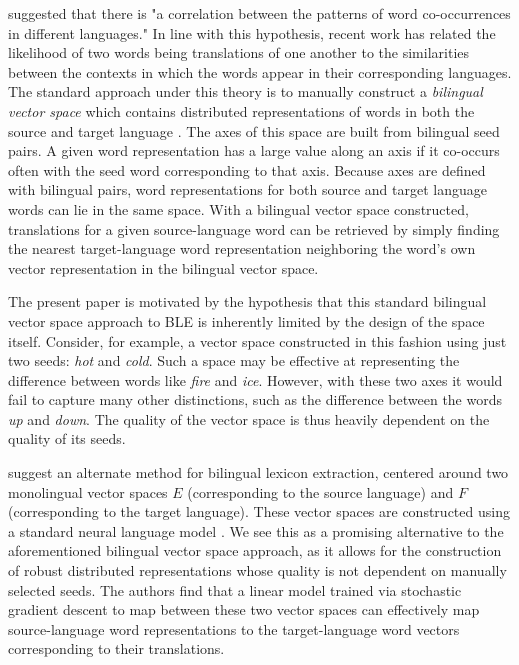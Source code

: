 \documentclass[11pt]{article}
\begin{document}
 suggested that there is "a correlation between the patterns
of word co-occurrences in different languages." In line with this hypothesis,
recent work has related the likelihood of two words being translations of one
another to the similarities between the contexts in which the words appear in
their corresponding languages. The standard approach under this theory is to
manually construct a \textit{bilingual vector space} which contains distributed
representations of words in both the source and target language
\cite{fung1998,vulic2013}. The axes of this space are built from
bilingual seed pairs. A given word representation has a large value along an axis
if it co-occurs often with the seed word corresponding to that axis. Because
axes are defined with bilingual pairs, word representations for both source and
target language words can lie in the same space. With a bilingual vector space
constructed, translations for a given source-language word can be retrieved by
simply finding the nearest target-language word representation neighboring the
word's own vector representation in the bilingual vector space.

The present paper is motivated by the hypothesis that this standard bilingual
vector space approach to BLE is inherently limited by the design of the space
itself.
Consider, for example, a vector
space constructed in this fashion using just two seeds: \textit{hot} and
\textit{cold}. Such a space may be effective at representing the difference
between words like \textit{fire} and \textit{ice}. However, with these two axes
it would fail to capture many other distinctions, such as the difference between
the words \textit{up} and \textit{down}. The quality of the vector space is
thus heavily dependent on the quality of its seeds.

 suggest an alternate method for bilingual lexicon
extraction, centered around two monolingual vector spaces $E$ (corresponding to the
source language) and $F$ (corresponding to the target language). These vector spaces
are constructed using a standard neural language model \cite{mikolov2013}. We see this as a promising alternative to the aforementioned bilingual vector space approach, as it allows for the construction of robust distributed representations whose quality is not dependent on manually selected seeds. The authors find
that a linear model trained via stochastic gradient descent to map between these two
vector spaces can effectively map source-language word representations to the
target-language word vectors corresponding to their translations.
\end{document}
